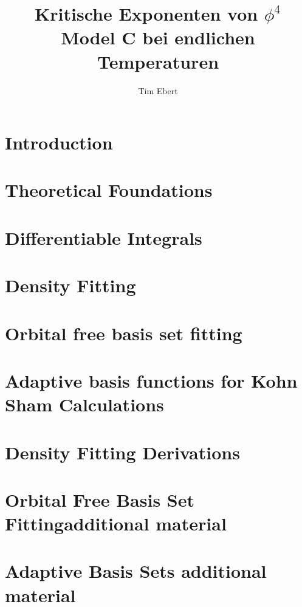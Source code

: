 \documentclass[12pt,twoside]{report}%
\author{Tim Ebert}
\title{Kritische Exponenten von $\phi^4$ Model C bei endlichen Temperaturen}
\begin{document}
\linespread{1.25}


\newpage

\tableofcontents
\chapter{Introduction} \label{chapter:introduction}

\chapter{Theoretical Foundations}

\chapter{Differentiable Integrals}

\chapter{Density Fitting} \label{chapter:densityfitting}

\chapter{Orbital free basis set fitting} \label{chapter:orbitalfreebasissetfitting}

\chapter{Adaptive basis functions for Kohn Sham Calculations} \label{chapter:adaptivebasisfunctions}

\begin{appendices}
    \chapter{Density Fitting Derivations}\label{appendix:densityfitting}
    
    \chapter{Orbital Free Basis Set Fittingadditional material}\label{appendix:orbitalfreebasissetfitting}
    
    \chapter{Adaptive Basis Sets additional material}\label{appendix:adaptivebasissets}
    
\end{appendices}
\printbibliography[heading=bibintoc, title={References}]
\clearpage
\newpage

\end{document}
